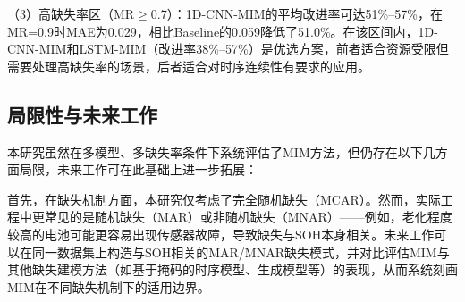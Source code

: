 \documentclass[10pt,a4paper]{ctexart}
\begin{document}
（3）高缺失率区（MR$\geq$0.7）：1D-CNN-MIM的平均改进率可达51\%--57\%，在MR=0.9时MAE为0.029，相比Baseline的0.059降低了51.0\%。在该区间内，1D-CNN-MIM和LSTM-MIM（改进率38\%--57\%）是优选方案，前者适合资源受限但需要处理高缺失率的场景，后者适合对时序连续性有要求的应用。




\subsection{局限性与未来工作}

本研究虽然在多模型、多缺失率条件下系统评估了MIM方法，但仍存在以下几方面局限，未来工作可在此基础上进一步拓展：

首先，在缺失机制方面，本研究仅考虑了完全随机缺失（MCAR）。然而，实际工程中更常见的是随机缺失（MAR）或非随机缺失（MNAR）——例如，老化程度较高的电池可能更容易出现传感器故障，导致缺失与SOH本身相关。未来工作可以在同一数据集上构造与SOH相关的MAR/MNAR缺失模式，并对比评估MIM与其他缺失建模方法（如基于掩码的时序模型、生成模型等）的表现，从而系统刻画MIM在不同缺失机制下的适用边界。
\end{document}
